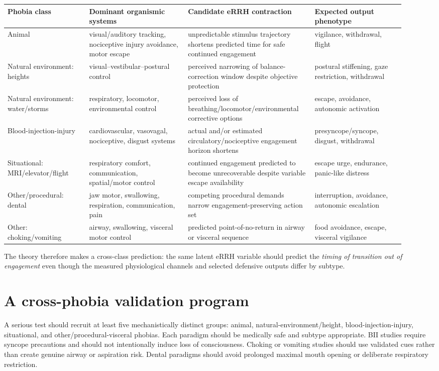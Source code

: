 \documentclass[10pt]{article}
\begin{document}
\begin{longtable}{p{0.19\linewidth}p{0.23\linewidth}p{0.29\linewidth}p{0.21\linewidth}}
\toprule
Phobia class & Dominant organismic systems & Candidate eRRH contraction & Expected output phenotype \\
\midrule
Animal & visual/auditory tracking, nociceptive injury avoidance, motor escape & unpredictable stimulus trajectory shortens predicted time for safe continued engagement & vigilance, withdrawal, flight \\
Natural environment: heights & visual--vestibular--postural control & perceived narrowing of balance-correction window despite objective protection & postural stiffening, gaze restriction, withdrawal \\
Natural environment: water/storms & respiratory, locomotor, environmental control & perceived loss of breathing/locomotor/environmental corrective options & escape, avoidance, autonomic activation \\
Blood-injection-injury & cardiovascular, vasovagal, nociceptive, disgust systems & actual and/or estimated circulatory/nociceptive engagement horizon shortens & presyncope/syncope, disgust, withdrawal \\
Situational: MRI/elevator/flight & respiratory comfort, communication, spatial/motor control & continued engagement predicted to become unrecoverable despite variable escape availability & escape urge, endurance, panic-like distress \\
Other/procedural: dental & jaw motor, swallowing, respiration, communication, pain & competing procedural demands narrow engagement-preserving action set & interruption, avoidance, autonomic escalation \\
Other: choking/vomiting & airway, swallowing, visceral motor control & predicted point-of-no-return in airway or visceral sequence & food avoidance, escape, visceral vigilance \\
\bottomrule
\end{longtable}

The theory therefore makes a cross-class prediction: the same latent eRRH variable should predict the \emph{timing of transition out of engagement} even though the measured physiological channels and selected defensive outputs differ by subtype.

\section{A cross-phobia validation program}
A serious test should recruit at least five mechanistically distinct groups: animal, natural-environment/height, blood-injection-injury, situational, and other/procedural-visceral phobias. Each paradigm should be medically safe and subtype appropriate. BII studies require syncope precautions and should not intentionally induce loss of consciousness. Choking or vomiting studies should use validated cues rather than create genuine airway or aspiration risk. Dental paradigms should avoid prolonged maximal mouth opening or deliberate respiratory restriction.
\end{document}

